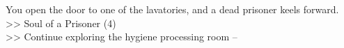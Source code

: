 You open the door to one of the lavatories, and a dead prisoner keels forward.\\
>> Soul of a Prisoner (4)\\

>> Continue exploring the hygiene processing room -- 